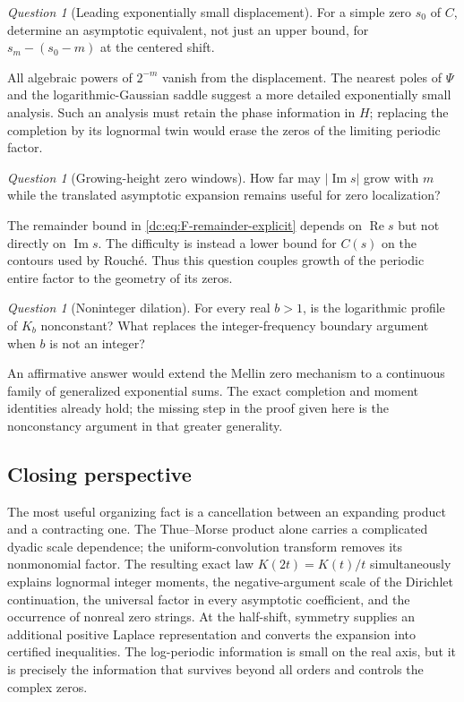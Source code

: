 \documentclass[11pt,a4paper,oneside,openany]{book}
\numberwithin{equation}{chapter}
\theoremstyle{definition}
\theoremstyle{remark}
\newtheorem{question}[theorem]{Question}
\newcommand{\abs}[1]{\left\lvert #1\right\rvert}
\DeclareMathOperator{\Rea}{Re}
\DeclareMathOperator{\Ima}{Im}
\begin{document}
\begin{question}[Leading exponentially small displacement]
For a simple zero $s_0$ of $C$, determine an asymptotic equivalent,
not just an upper bound, for $s_m-(s_0-m)$ at the centered shift.
\end{question}
All algebraic powers of $2^{-m}$ vanish from the displacement.
The nearest poles of $\Psi$ and the logarithmic-Gaussian saddle
suggest a more detailed exponentially small analysis. Such an
analysis must retain the phase information in $H$; replacing the
completion by its lognormal twin would erase the zeros of the
limiting periodic factor.

\begin{question}[Growing-height zero windows]
How far may $\abs{\Ima s}$ grow with $m$ while the translated
asymptotic expansion remains useful for zero localization?
\end{question}
The remainder bound in \cref{dc:eq:F-remainder-explicit} depends on
$\Rea s$ but not directly on $\Ima s$. The difficulty is instead a
lower bound for $C(s)$ on the contours used by Rouch\'e. Thus this
question couples growth of the periodic entire factor to the
geometry of its zeros.

\begin{question}[Noninteger dilation]
For every real $b>1$, is the logarithmic profile of $K_b$ nonconstant?
What replaces the integer-frequency boundary argument when $b$ is
not an integer?
\end{question}
An affirmative answer would extend the Mellin zero mechanism to a
continuous family of generalized exponential sums. The exact
completion and moment identities already hold; the missing step in
the proof given here is the nonconstancy argument in that greater
generality.

\subsection*{Closing perspective}
The most useful organizing fact is a cancellation between an
expanding product and a contracting one. The Thue--Morse product
alone carries a complicated dyadic scale dependence; the
uniform-convolution transform removes its nonmonomial factor.
The resulting exact law $K(2t)=K(t)/t$ simultaneously explains
lognormal integer moments, the negative-argument scale of the
Dirichlet continuation, the universal factor in every asymptotic
coefficient, and the occurrence of nonreal zero strings.
At the half-shift, symmetry supplies an additional positive
Laplace representation and converts the expansion into certified
inequalities. The log-periodic information is small on the real
axis, but it is precisely the information that survives beyond all
orders and controls the complex zeros.
\end{document}
